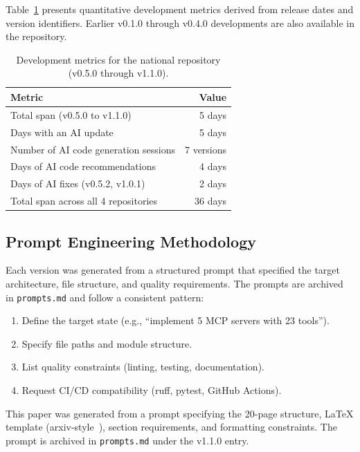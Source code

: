 Table~\ref{tab:dev-metrics} presents quantitative development metrics derived from release dates and version identifiers. Earlier v0.1.0 through v0.4.0 developments are also available in the repository. 

\begin{table}[H]
\centering
\caption{Development metrics for the national repository (v0.5.0 through v1.1.0).}
\label{tab:dev-metrics}
\small
\begin{tabular}{@{}lr@{}}
\toprule
\textbf{Metric} & \textbf{Value} \\
\midrule
Total span (v0.5.0 to v1.1.0) & 5 days \\
Days with an AI update & 5 days \\
Number of AI code generation sessions & 7 versions \\
Days of AI code recommendations & 4 days \\
Days of AI fixes (v0.5.2, v1.0.1) & 2 days \\
Total span across all 4 repositories & 36 days \\
\bottomrule
\end{tabular}
\end{table}

\subsection{Prompt Engineering Methodology}

Each version was generated from a structured prompt that specified the target architecture, file structure, and quality requirements. The prompts are archived in \texttt{prompts.md} and follow a consistent pattern:

\begin{enumerate}[leftmargin=*]
\item Define the target state (e.g., ``implement 5 MCP servers with 23 tools'').
\item Specify file paths and module structure.
\item List quality constraints (linting, testing, documentation).
\item Request CI/CD compatibility (ruff, pytest, GitHub Actions).
\end{enumerate}

This paper was generated from a prompt specifying the 20-page structure, LaTeX template (arxiv-style~\cite{arxivstyle}), section requirements, and formatting constraints. The prompt is archived in \texttt{prompts.md} under the v1.1.0 entry.

